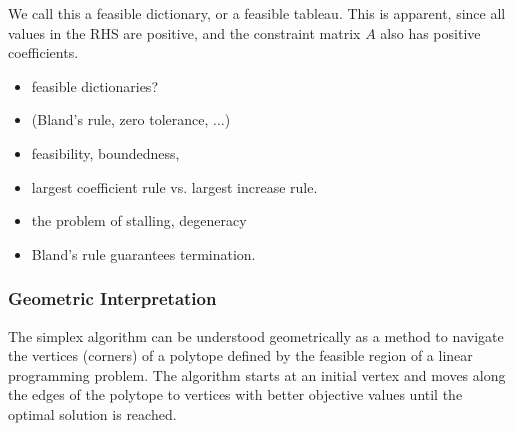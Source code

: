 We call this a feasible dictionary\parencite{chvatal1983linear}, or a feasible tableau. This is apparent, since all
values in the RHS are positive, and the constraint matrix $A$ also has positive coefficients.
\begin{itemize}
    \item feasible dictionaries?
    \item (Bland's rule, zero tolerance, ...)
    \item feasibility, boundedness,
    \item largest coefficient rule vs. largest increase rule.
    \item the problem of stalling, degeneracy
    \item Bland's rule guarantees termination.

\end{itemize}

\subsubsection{Geometric Interpretation}
The simplex algorithm can be understood geometrically as a
method to navigate the vertices (corners) of a polytope
defined by the feasible region of a linear programming problem.
The algorithm starts at an initial vertex and moves along
the edges of the polytope to vertices with better objective
values until the optimal solution is reached.
\begin{center}
\end{center}

